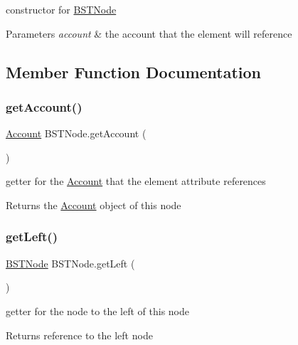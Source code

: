 constructor for \hyperlink{class_b_s_t_node}{B\+S\+T\+Node} 


\begin{DoxyParams}{Parameters}
{\em account} & the account that the element will reference \\
\hline
\end{DoxyParams}


\subsection{Member Function Documentation}
\mbox{\label{class_b_s_t_node_a182e6ee7245ac0f1f2911fd0118625e5}} 
\subsubsection{\texorpdfstring{get\+Account()}{getAccount()}}
{\footnotesize\ttfamily \hyperlink{class_account}{Account} B\+S\+T\+Node.\+get\+Account (\begin{DoxyParamCaption}{ }\end{DoxyParamCaption})}



getter for the \hyperlink{class_account}{Account} that the element attribute references 

\begin{DoxyReturn}{Returns}
the \hyperlink{class_account}{Account} object of this node 
\end{DoxyReturn}
\mbox{\label{class_b_s_t_node_aa54083ff3ae616311f577131f4b66e64}} 
\subsubsection{\texorpdfstring{get\+Left()}{getLeft()}}
{\footnotesize\ttfamily \hyperlink{class_b_s_t_node}{B\+S\+T\+Node} B\+S\+T\+Node.\+get\+Left (\begin{DoxyParamCaption}{ }\end{DoxyParamCaption})}



getter for the node to the left of this node 

\begin{DoxyReturn}{Returns}
reference to the left node 
\end{DoxyReturn}
\mbox{\label{class_b_s_t_node_a986cf72ed573103cf1f27234970eda98}} 

